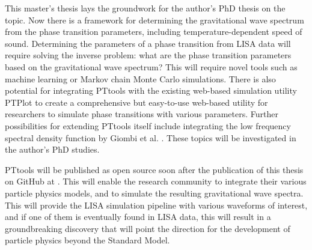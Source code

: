 This master's thesis lays the groundwork for the author's PhD thesis on the topic.
Now there is a framework for determining the gravitational wave spectrum from the phase transition parameters, including temperature-dependent speed of sound.
Determining the parameters of a phase transition from LISA data will require solving the inverse problem: what are the phase transition parameters based on the gravitational wave spectrum?
This will require novel tools such as machine learning or Markov chain Monte Carlo simulations.
There is also potential for integrating PTtools with the existing web-based simulation utility PTPlot \cites{ptplot}{hindmarsh_shape_2017}{caprini_detecting_2020} to create a comprehensive but easy-to-use web-based utility for researchers to simulate phase transitions with various parameters.
Further possibilities for extending PTtools itself include integrating the low frequency spectral density function by Giombi et al. \cite[eq. 3.6]{giombi_cs_2024}.
These topics will be investigated in the author's PhD studies.

PTtools will be published as open source soon after the publication of this thesis on GitHub at \cite{pttools}.
This will enable the research community to integrate their various particle physics models,
and to simulate the resulting gravitational wave spectra.
This will provide the LISA simulation pipeline with various waveforms of interest,
and if one of them is eventually found in LISA data,
this will result in a groundbreaking discovery
that will point the direction for the development of particle physics beyond the Standard Model.
